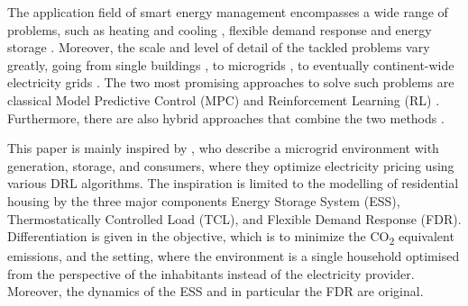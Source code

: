 The application field of smart energy management encompasses a wide range of problems, such as heating and cooling \cite{Blum.2021}\cite{ThomasSchreiber.2020}, flexible demand response \cite{Jin.2021} and energy storage \cite{Nakabi.2021}. Moreover, the scale and level of detail of the tackled problems vary greatly, going from single buildings \cite{Blum.2021}, to microgrids \cite{Nakabi.2021} \cite{Castellanos.04.12.2022}, to eventually continent-wide electricity grids \cite{Horsch.2018}. The two most promising approaches to solve such problems are classical Model Predictive Control (MPC) \cite{Basantes.2023} and Reinforcement Learning (RL) \cite{Nakabi.2021} \cite{Jin.2021} \cite{ThomasSchreiber.2020}\cite{Zhu.2022}. Furthermore, there are also hybrid approaches that combine the two methods \cite{JavierArroyo.2022}.
\par
This paper is mainly inspired by \cite{Nakabi.2021}, who describe a microgrid environment with generation, storage, and consumers, where they optimize electricity pricing using various DRL algorithms. The inspiration is limited to the modelling of residential housing by the three major components Energy Storage System (ESS), Thermostatically Controlled Load (TCL), and Flexible Demand Response (FDR). Differentiation is given in the objective, which is to minimize the CO\textsubscript{2} equivalent emissions, and the setting, where the environment is a single household optimised from the perspective of the inhabitants instead of the electricity provider. Moreover, the dynamics of the ESS and in particular the FDR are original.
